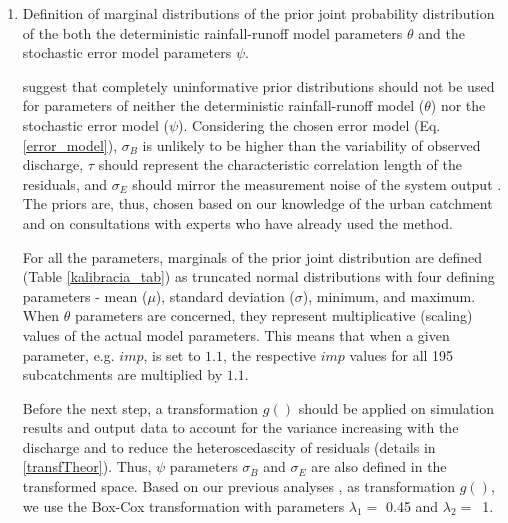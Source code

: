\documentclass{ctuthesis}\usepackage[]{graphicx}\usepackage[]{color}
\begin{document}
\begin{enumerate}
	\item  Definition of marginal distributions of the prior joint probability distribution of the both the deterministic rainfall-runoff model parameters $\theta$  and  the stochastic error model parameters $\psi$.
        
         \cite{giudice2013improving} suggest that completely uninformative prior distributions should not be used for parameters of neither the deterministic rainfall-runoff model ($\theta$) nor  the stochastic error model ($\psi$). Considering the chosen error model (Eq. \ref{error_model}), $\sigma_{B}$ is unlikely to be higher than the variability of observed discharge, $\tau$ should represent the characteristic correlation length of the residuals, and  $\sigma_E$ should mirror the measurement noise of the system output \cite{giudice2013improving}. The priors are, thus, chosen based on our knowledge of the urban catchment and on consultations with experts who have already used the method.

        For all the parameters, marginals of the prior joint distribution are defined (Table \ref{kalibracia_tab}) as truncated normal distributions with four defining parameters - mean ($\mu$), standard deviation ($\sigma$), minimum, and maximum. When $\theta$ parameters are concerned, they represent multiplicative (scaling) values of the actual model parameters. This means that when a given parameter, e.g. $imp$, is set to $1.1$, the respective $imp$ values for all 195 subcatchments are multiplied by $1.1$.
             
        Before the next step, a transformation $g()$  should be applied on simulation results and output data to account for the variance increasing with the discharge and to reduce the heteroscedascity of residuals (details in \ref{transfTheor}). Thus, $\psi$ parameters $\sigma_B$ and  $\sigma_E$ are also defined in the transformed space. Based on our previous analyses \citep{pastorekEffectDifferentRainfall2016}, as transformation $g()$, we use the Box-Cox transformation \citep{box1964analysis} with parameters $\lambda_1 =$ 0.45 and $\lambda_2 =$~1.  
   


\end{enumerate}
\end{document}
